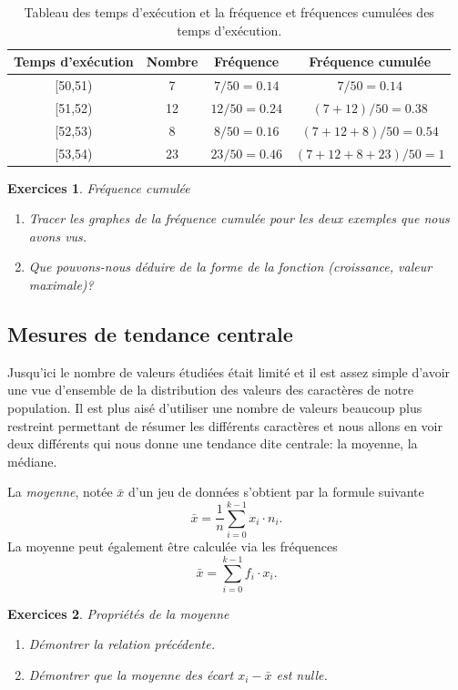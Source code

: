 \documentclass[a4paper,12pt]{book}
\newtheorem*{exercices}{Exercices}
\begin{document}
  \begin{table}[htp]
\begin{center}
\begin{tabular}{|c|c|c|c|}
\hline
 Temps d'exécution & Nombre & Fréquence & Fréquence cumulée \\
 \hline\hline
 [50,51) & 7 & $7/50=0.14$ & $7/50=0.14$ \\
 \hline
 [51,52) & 12 & $12/50=0.24$ & $(7+12)/50=0.38$  \\
 \hline
 [52,53) & 8 & $8/50=0.16$ & $(7+12+8)/50=0.54$  \\
 \hline
 [53,54) & 23 & $23/50=0.46$ & $(7+12+8+23)/50=1$  \\
 \hline
\end{tabular}
\end{center}
\caption{Tableau des temps d'exécution et la fréquence et fréquences cumulées des temps d'exécution.}\label{table_exec_freqcum}
\end{table}
\begin{exercices}{Fréquence cumulée}
\begin{enumerate}
 \item Tracer les graphes de la fréquence cumulée pour les deux exemples que nous avons vus.
 \item Que pouvons-nous déduire de la forme de la fonction (croissance, valeur maximale)?
\end{enumerate}

 
\end{exercices}


\subsection{Mesures de tendance centrale}

Jusqu'ici le nombre de valeurs étudiées était limité et il est assez simple d'avoir 
une vue d'ensemble de la distribution des valeurs des caractères de notre population.
Il est plus aisé d'utiliser une nombre de valeurs beaucoup plus restreint permettant
de résumer les différents caractères et nous allons en voir deux différents qui nous donne une tendance dite centrale:
la moyenne, la médiane.

La \textit{moyenne}, notée $\bar{x}$ d'un jeu de données s'obtient par la formule suivante
\begin{equation}
 \bar{x}=\frac{1}{n}\sum_{i=0}^{k-1}x_i\cdot n_i.
\end{equation}
La moyenne peut également être calculée via les fréquences
\begin{equation}
 \bar{x}=\sum_{i=0}^{k-1}f_i\cdot x_i.
\end{equation}
\begin{exercices}{Propriétés de la moyenne}
\begin{enumerate}
 \item Démontrer la relation précédente.
 \item Démontrer que la moyenne des écart $x_i-\bar{x}$ est nulle.
\end{enumerate}
\end{exercices}
\end{document}
